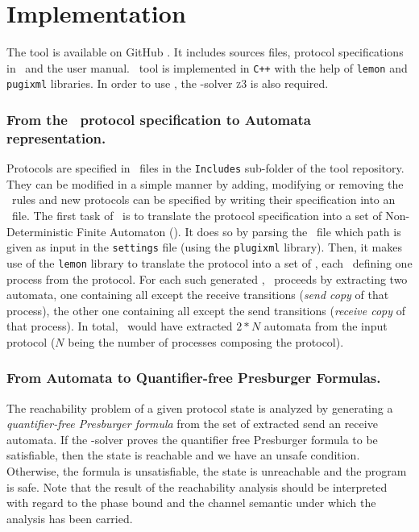 \section{Implementation}
\label{sec:optim}

The tool is available on GitHub \cite{github.MPass}.
It includes sources files, protocol specifications in \Xml\ and the user manual.
%
\MPass\ tool is implemented in \texttt{C++} with the help of \texttt{lemon} and \texttt{pugixml} libraries.
%
In order to use \MPass, the \Smt-solver \textsc{z3} is also required.

\subsubsection*{From the \Xml\ protocol specification to Automata representation.}
\label{subsec:copies}
Protocols are specified in \Xml\ files in the \texttt{Includes} sub-folder of the tool repository.
%
They can be modified in a simple manner by adding, modifying or removing the \Xml\ rules and
new protocols can be specified by writing their specification into an \Xml\ file.
%
The first task of \MPass\ is to translate the protocol specification into a set of Non-Deterministic Finite Automaton (\Nfa).
%
It does so by parsing the \Xml\ file which path is given as input in the \texttt{settings} file (using the \texttt{plugixml} library).
%
Then, it makes use of the \texttt{lemon} library to translate the protocol into a set of \Nfa,
each \Nfa\ defining one process from the protocol.
%
For each such generated \Nfa, \MPass\ proceeds by extracting two automata,
one containing all except the receive transitions (\textit{send copy} of that process),
the other one containing all except the send transitions (\textit{receive copy} of that process).
%
In total, \MPass\ would have extracted $2*N$ automata from the input protocol
($N$ being the number of processes composing the protocol).

\subsubsection*{From Automata to Quantifier-free Presburger Formulas.}
The reachability problem of a given protocol state is analyzed by generating a \emph{quantifier-free Presburger formula}
from the set of extracted send an receive automata.
%
%
%
%
If the \Smt-solver proves the quantifier free Presburger formula to be satisfiable,
then the state is reachable and we have an unsafe condition.
Otherwise, the formula is unsatisfiable, the state is unreachable and the program is safe.
%
Note that the result of the reachability analysis should be interpreted with regard to the phase bound and the channel semantic under which the analysis has been carried.

